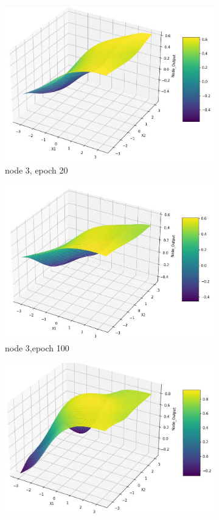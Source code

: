 \documentclass[11pt]{article}
\begin{document}
\begin{figure}[h!]
\begin{subfigure}[b]{0.3\textwidth}
	\includegraphics[scale=0.14]{hidden2_n3_e20.jpg}
	\caption{node 3, epoch 20}
	\label{fig:fig2.1.6.13}
	\end{subfigure}
	\begin{subfigure}[b]{0.45\textwidth}
	\centering
	\includegraphics[scale=0.14]{hidden2_n3_e100.jpg}
	\caption{node 3,epoch 100}
	\label{fig:fig2.1.6.14}
	\end{subfigure}
	\begin{subfigure}[b]{0.45\textwidth}
	\centering
	\includegraphics[scale=0.14]{hidden2_n3_c.jpg}

\end{subfigure}
\end{figure}
\end{document}
